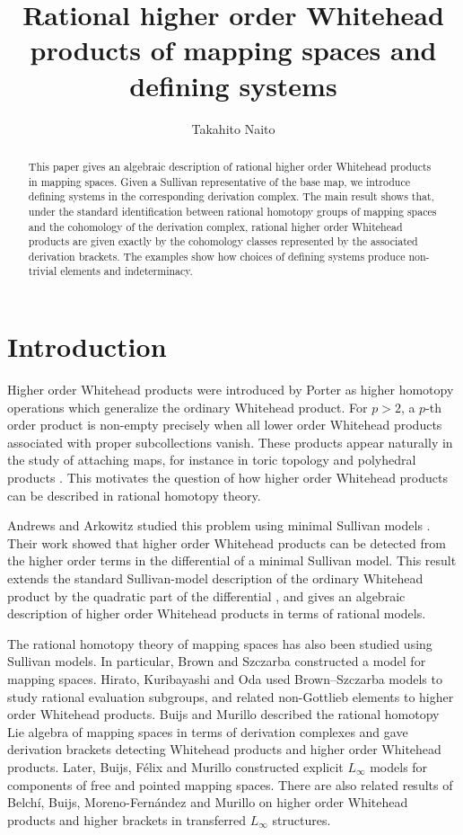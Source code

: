 \documentclass[a4paper,10pt]{amsart}
\title[Higher order Whitehead products and defining systems]
{Rational higher order Whitehead products of mapping spaces and defining systems}
\author{
Takahito Naito
}
\date{}
\theoremstyle{definition}
\theoremstyle{remark}
\numberwithin{equation}{section}
\begin{document}
\begin{abstract}
This paper gives an algebraic description of rational higher order Whitehead products in mapping spaces.
Given a Sullivan representative of the base map, we introduce defining systems in the corresponding derivation complex.
The main result shows that, under the standard identification between rational homotopy groups of
mapping spaces and the cohomology of the derivation complex, rational higher order Whitehead products are given exactly by the cohomology classes represented by the associated derivation brackets. 
The examples show how choices of defining systems produce non-trivial elements and indeterminacy.
\end{abstract}

\maketitle


\section{Introduction}


Higher order Whitehead products were introduced by Porter \cite{Po1965} as higher
homotopy operations which generalize the ordinary Whitehead product. For
$p>2$, a $p$-th order product is non-empty precisely when all lower order
Whitehead products associated with proper subcollections vanish.
These products appear naturally in the study of attaching maps, for instance in
toric topology and polyhedral products \cite{GT2010,IK2020}.
This motivates the question of how higher order Whitehead products can be described in rational homotopy theory.

Andrews and Arkowitz studied this problem using minimal Sullivan models
\cite{AA1978}. Their work showed that higher order Whitehead products can be detected
from the higher order terms in the differential of a minimal Sullivan model.
This result extends the standard Sullivan-model description of the ordinary
Whitehead product by the quadratic part of the differential
\cite[\S 13(e)]{FHT}, and gives an algebraic description of higher order
Whitehead products in terms of rational models.

The rational homotopy theory of mapping spaces has also been studied using
Sullivan models.
In particular, Brown and Szczarba \cite{BS1997} constructed a model for
mapping spaces.
Hirato, Kuribayashi and Oda \cite{HKO2008} used Brown--Szczarba
models to study rational evaluation subgroups, and related non-Gottlieb elements
to higher order Whitehead products.
Buijs and Murillo  \cite{BM2008} described the rational homotopy Lie algebra of mapping spaces in terms of derivation complexes and gave derivation brackets detecting Whitehead products and higher order
Whitehead products.
Later, Buijs, F{\'e}lix and Murillo \cite{BFM2012} constructed explicit $L_\infty$ models for components of free and pointed
mapping spaces. There are also related results of Belch{\'i},
Buijs, Moreno-Fern{\'a}ndez and Murillo \cite{BBMM2017} on higher order Whitehead products
and higher brackets in transferred $L_\infty$ structures.
\end{document}
